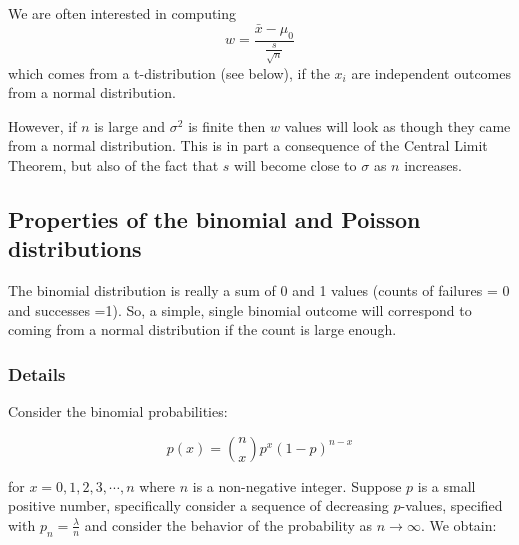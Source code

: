 \documentclass[12pt,a4paper]{article}
\theoremstyle{regla}
\theoremstyle{remark}
\theoremstyle{definition}
\theoremstyle{nonumberbreak}
\begin{document}
\begin{xmpl}
We are often interested in computing
$$
w=\frac{\bar{x}-\mu_0}{\frac{s}{\sqrt{n}}}
$$
which comes from a t-distribution (see below), if the $x_i$ are independent outcomes from a normal distribution. 

However, if $n$ is large and $\sigma^2$ is finite then $w$ values will look as though they came from a normal distribution. 
This is in part a consequence of the Central Limit Theorem, but also of the fact that $s$ will become close to $\sigma$ as $n$ increases.
\end{xmpl}

\subsection{Properties of the binomial and Poisson distributions}
\begin{fbox}
\begin{minipage}{0.97\textwidth}
The binomial distribution is really a sum of 0 and 1 values (counts of failures = 0 and successes =1). So, a simple, single binomial outcome will correspond to coming from a normal distribution if the count is large enough.
\end{minipage}
\end{fbox}
\subsubsection{Details}
Consider the binomial probabilities:

$$p(x)=\binom{n}{x}p^x(1-p)^{n-x}$$

for $x=0,1,2,3, \cdots,n$ where $n$ is a non-negative integer.  Suppose $p$ is a small positive number, specifically consider a sequence of decreasing $p$-values, specified with $p_n= \frac{\lambda}{n}$ and consider the behavior of the probability as $n \rightarrow \infty$. We obtain:
\end{document}
